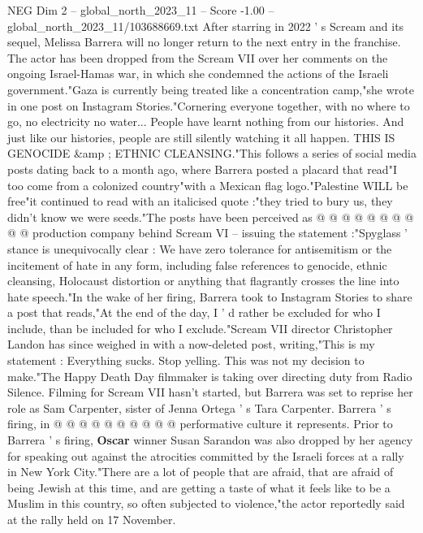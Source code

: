 \begin{textsample}{NEG Dim 2 – global\_north\_2023\_11 – Score -1.00 – global\_north\_2023\_11/103688669.txt}  \label{ex:f2_neg_135}
After starring in 2022 ' s Scream and its sequel, Melissa Barrera will no longer return to the next entry in the franchise.
The actor has been dropped from the Scream VII over her comments on the ongoing Israel-Hamas war, in which she condemned the actions of the Israeli government."Gaza is currently being treated like a concentration camp,"she wrote in one post on Instagram Stories."Cornering everyone together, with no where to go, no electricity no water...
People have learnt nothing from our histories.
And just like our histories, people are still silently watching it all happen.
THIS IS GENOCIDE \&amp ; ETHNIC CLEANSING."This follows a series of social media posts dating back to a month ago, where Barrera posted a placard that read"I too come from a colonized country"with a Mexican flag logo."Palestine WILL be free"it continued to read with an italicised quote :"they tried to bury us, they didn't know we were seeds."The posts have been perceived as @ @ @ @ @ @ @ @ @ @ production company behind Scream VI -- issuing the statement :"Spyglass ' stance is unequivocally clear : We have zero tolerance for antisemitism or the incitement of hate in any form, including false references to genocide, ethnic cleansing, Holocaust distortion or anything that flagrantly crosses the line into hate speech."In the wake of her firing, Barrera took to Instagram Stories to share a post that reads,"At the end of the day, I ' d rather be excluded for who I include, than be included for who I exclude."Scream VII director Christopher Landon has since weighed in with a now-deleted post, writing,"This is my statement : Everything sucks.
Stop yelling.
This was not my decision to make."The Happy Death Day filmmaker is taking over directing duty from Radio Silence.
Filming for Scream VII hasn't started, but Barrera was set to reprise her role as Sam Carpenter, sister of Jenna Ortega ' s Tara Carpenter.
Barrera ' s firing, in @ @ @ @ @ @ @ @ @ @ performative culture it represents.
Prior to Barrera ' s firing, \textbf{Oscar} winner Susan Sarandon was also dropped by her agency for speaking out against the atrocities committed by the Israeli forces at a rally in New York City."There are a lot of people that are afraid, that are afraid of being Jewish at this time, and are getting a taste of what it feels like to be a Muslim in this country, so often subjected to violence,"the actor reportedly said at the rally held on 17 November.

\end{textsample}
